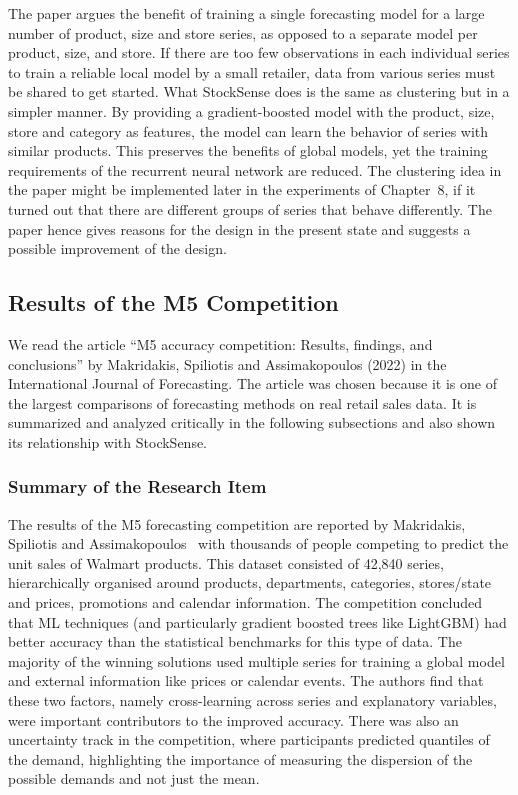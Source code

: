 \documentclass{StockSense}
\begin{document}
The paper argues the benefit of training a single forecasting model for a large number of product, size and store series, as opposed to a separate model per product, size, and store. If there are too few observations in each individual series to train a reliable local model by a small retailer, data from various series must be shared to get started. What StockSense does is the same as clustering but in a simpler manner. By providing a gradient-boosted model with the product, size, store and category as features, the model can learn the behavior of series with similar products. This preserves the benefits of global models, yet the training requirements of the recurrent neural network are reduced. The clustering idea in the paper might be implemented later in the experiments of Chapter~8, if it turned out that there are different groups of series that behave differently. The paper hence gives reasons for the design in the present state and suggests a possible improvement of the design.

\subsection{Results of the M5 Competition}

We read the article “M5 accuracy competition: Results, findings, and conclusions” by Makridakis, Spiliotis and Assimakopoulos (2022) in the International Journal of Forecasting. The article was chosen because it is one of the largest comparisons of forecasting methods on real retail sales data. It is summarized and analyzed critically in the following subsections and also shown its relationship with StockSense.

\subsubsection{Summary of the Research Item}

The results of the M5 forecasting competition are reported by Makridakis, Spiliotis and Assimakopoulos~\cite{makridakis2022m5} with thousands of people competing to predict the unit sales of Walmart products. This dataset consisted of 42,840 series, hierarchically organised around products, departments, categories, stores/state and prices, promotions and calendar information. The competition concluded that ML techniques (and particularly gradient boosted trees like LightGBM) had better accuracy than the statistical benchmarks for this type of data. The majority of the winning solutions used multiple series for training a global model and external information like prices or calendar events. The authors find that these two factors, namely cross-learning across series and explanatory variables, were important contributors to the improved accuracy. There was also an uncertainty track in the competition, where participants predicted quantiles of the demand, highlighting the importance of measuring the dispersion of the possible demands and not just the mean.
\end{document}

